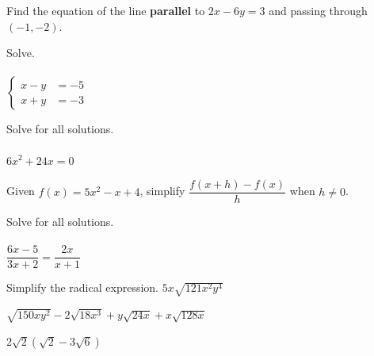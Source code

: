 \documentclass[addpoints,12pt,answers]{exam}
\begin{document}
\begin{questions}
\begin{solution}
\begin{itemize}
\end{itemize}
\end{solution}

\newpage

\question[4] Find the equation of the line \textbf{parallel} to $2x-6y=3$ and passing through $(-1,-2)$.
\answerline

\question[5] Solve.\\ \\ $\left\{\begin{aligned}x-y &= -5\\ x+y &= -3\end{aligned}\right.$
\answerline

\newpage

\question[4] Solve for all solutions.\\ \\ $6x^2+24x=0$
\answerline

\question[5] Given $f(x)=5x^2-x+4$, simplify $\dfrac{f(x+h)-f(x)}{h}$ when $h\neq 0$.
\answerline

\newpage

\question[5] Solve for all solutions. \\ \\ $\dfrac{6x-5}{3x+2} = \dfrac{2x}{x+1}$
\answerline

\question[4] Simplify the radical expression. $5x\sqrt{121x^2y^4}$
\answerline

\newpage


\question[5]\label{rad-simp-begin} $\sqrt{150xy^2}-2\sqrt{18x^3}+y\sqrt{24x}+x\sqrt{128x}$
\answerline

\newpage
{}

\question[4] $2\sqrt{2}(\sqrt{2}-3\sqrt{6})$
\answerline


\end{questions}
\end{document}

